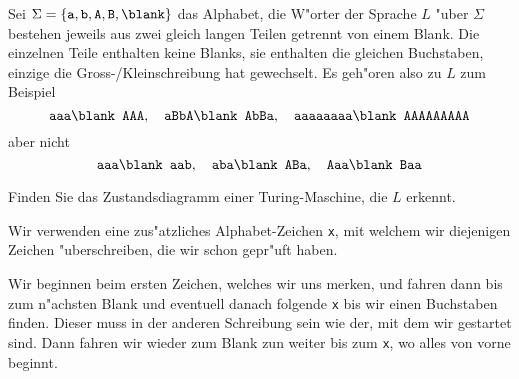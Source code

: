 Sei $\Sigma=\{\texttt{a},\texttt{b},\texttt{A},\texttt{B},\blank\}$
das Alphabet, die W"orter der Sprache $L$ "uber $\Sigma$ bestehen
jeweils aus zwei gleich langen Teilen getrennt von einem Blank.
Die einzelnen Teile enthalten keine Blanks,
sie enthalten die gleichen Buchstaben, einzige die
Gross-/Kleinschreibung hat gewechselt.
Es geh"oren also zu $L$ zum Beispiel
\[
\texttt{aaa\blank AAA},\quad
\texttt{aBbA\blank AbBa},\quad
\texttt{aaaaaaaa\blank AAAAAAAAA}
\]
aber nicht
\[
\texttt{aaa\blank aab},\quad
\texttt{aba\blank ABa},\quad
\texttt{Aaa\blank Baa}
\]

Finden Sie das Zustandsdiagramm einer Turing-Maschine, die $L$ erkennt.

\begin{loesung}
Wir verwenden eine zus"atzliches Alphabet-Zeichen \texttt{x}, mit welchem
wir diejenigen Zeichen "uberschreiben, die wir schon gepr"uft haben.

Wir beginnen beim ersten Zeichen, welches wir uns merken, und fahren
dann bis zum n"achsten Blank und eventuell danach folgende \texttt{x}
bis wir einen Buchstaben finden.
Dieser muss in der anderen Schreibung sein wie der, mit dem wir
gestartet sind.
Dann fahren wir wieder zum Blank zun weiter bis zum \texttt{x}, wo alles
von vorne beginnt.


\end{loesung}
